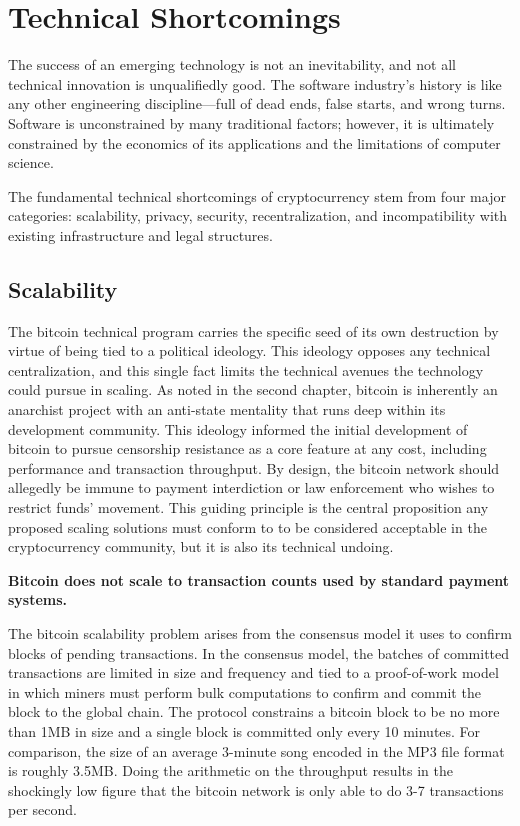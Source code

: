 \chapter{Technical Shortcomings}

The success of an emerging technology is not an inevitability, and not all
technical innovation is unqualifiedly good. The software industry's history is
like any other engineering discipline---full of dead ends, false starts, and
wrong turns. Software is unconstrained by many traditional factors; however, it
is ultimately constrained by the economics of its applications and the
limitations of computer science.

The fundamental technical shortcomings of cryptocurrency stem from four major
categories: scalability, privacy, security, recentralization, and
incompatibility with existing infrastructure and legal structures.


\section{Scalability}

The bitcoin technical program carries the specific seed of its own destruction
by virtue of being tied to a political ideology. This ideology opposes any
technical centralization, and this single fact limits the technical avenues the
technology could pursue in scaling. As noted in the second chapter, bitcoin is
inherently an anarchist project with an anti-state mentality that runs deep
within its development community. This ideology informed the initial development
of bitcoin to pursue censorship resistance as a core feature at any cost,
including performance and transaction throughput. By design, the bitcoin network
should allegedly be immune to payment interdiction or law enforcement who wishes
to restrict funds' movement. This guiding principle is the central proposition
any proposed scaling solutions must conform to to be considered acceptable in
the cryptocurrency community, but it is also its technical undoing.

\begin{infobox}
 \textbf{
   Bitcoin does not scale to transaction counts used by standard payment
   systems.
  }
\end{infobox}

The bitcoin scalability problem arises from the consensus model it uses to
confirm blocks of pending transactions. In the consensus model, the batches of
committed transactions are limited in size and frequency and tied to a
proof-of-work model in which miners must perform bulk computations to confirm
and commit the block to the global chain. The protocol constrains a bitcoin
block to be no more than 1MB in size and a single block is committed only every
10 minutes. For comparison, the size of an average 3-minute song encoded in the
MP3 file format is roughly 3.5MB. Doing the arithmetic on the throughput results
in the shockingly low figure that the bitcoin network is only able to do 3-7
transactions per second.

